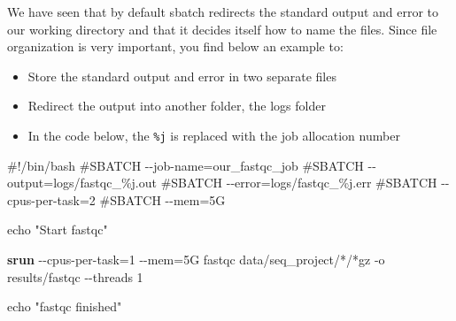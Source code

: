 \documentclass[
  letterpaper,
  DIV=11,
  numbers=noendperiod]{scrreprt}
\newenvironment{Shaded}{}{}
\newcommand{\AttributeTok}[1]{\textcolor[rgb]{0.84,0.23,0.29}{#1}}
\newcommand{\BuiltInTok}[1]{\textcolor[rgb]{0.84,0.23,0.29}{#1}}
\newcommand{\CommentTok}[1]{\textcolor[rgb]{0.42,0.45,0.49}{#1}}
\newcommand{\ExtensionTok}[1]{\textcolor[rgb]{0.84,0.23,0.29}{\textbf{#1}}}
\newcommand{\NormalTok}[1]{\textcolor[rgb]{0.14,0.16,0.18}{#1}}
\newcommand{\OperatorTok}[1]{\textcolor[rgb]{0.14,0.16,0.18}{#1}}
\newcommand{\PreprocessorTok}[1]{\textcolor[rgb]{0.84,0.23,0.29}{#1}}
\newcommand{\StringTok}[1]{\textcolor[rgb]{0.01,0.18,0.38}{#1}}
\providecommand{\tightlist}{%
  \setlength{\itemsep}{0pt}\setlength{\parskip}{0pt}}\usepackage{longtable,booktabs,array}
\begin{document}
\begin{tcolorbox}[enhanced jigsaw, coltitle=black, leftrule=.75mm, colback=white, toptitle=1mm, breakable, toprule=.15mm, colbacktitle=quarto-callout-tip-color!10!white, bottomtitle=1mm, arc=.35mm, opacitybacktitle=0.6, bottomrule=.15mm, titlerule=0mm, title=\textcolor{quarto-callout-tip-color}{\faLightbulb}\hspace{0.5em}{Tip: sbatch and better log files}, rightrule=.15mm, left=2mm, colframe=quarto-callout-tip-color-frame, opacityback=0]

We have seen that by default sbatch redirects the standard output and
error to our working directory and that it decides itself how to name
the files. Since file organization is very important, you find below an
example to:

\begin{itemize}
\tightlist
\item
  Store the standard output and error in two separate files
\item
  Redirect the output into another folder, the logs folder
\item
  In the code below, the \texttt{\%j} is replaced with the job
  allocation number
\end{itemize}

\begin{Shaded}
\begin{Highlighting}[]
\CommentTok{\#!/bin/bash}
\CommentTok{\#SBATCH {-}{-}job{-}name=our\_fastqc\_job}
\CommentTok{\#SBATCH {-}{-}output=logs/fastqc\_\%j.out}
\CommentTok{\#SBATCH {-}{-}error=logs/fastqc\_\%j.err}
\CommentTok{\#SBATCH {-}{-}cpus{-}per{-}task=2}
\CommentTok{\#SBATCH {-}{-}mem=5G}

\BuiltInTok{echo} \StringTok{"Start fastqc"}

\ExtensionTok{srun} \AttributeTok{{-}{-}cpus{-}per{-}task}\OperatorTok{=}\NormalTok{1 }\AttributeTok{{-}{-}mem}\OperatorTok{=}\NormalTok{5G fastqc data/seq\_project/}\PreprocessorTok{*}\NormalTok{/}\PreprocessorTok{*}\NormalTok{gz }\AttributeTok{{-}o}\NormalTok{ results/fastqc  }\AttributeTok{{-}{-}threads}\NormalTok{ 1}

\BuiltInTok{echo} \StringTok{"fastqc finished"}
\end{Highlighting}
\end{Shaded}

\end{tcolorbox}
\end{document}
